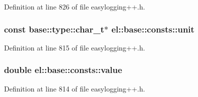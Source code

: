 Definition at line 826 of file easylogging++.\+h.

\hypertarget{namespaceel_1_1base_1_1consts_a0c99046e04195e209e09f90ea71dd5fd}{}
\subsubsection[{unit}]{\setlength{\rightskip}{0pt plus 5cm}const {\bf base\+::type\+::char\+\_\+t}$\ast$ el\+::base\+::consts\+::unit}\label{namespaceel_1_1base_1_1consts_a0c99046e04195e209e09f90ea71dd5fd}


Definition at line 815 of file easylogging++.\+h.

\hypertarget{namespaceel_1_1base_1_1consts_a7463944511904d9ca3dd4b6933a3e6f1}{}
\subsubsection[{value}]{\setlength{\rightskip}{0pt plus 5cm}double el\+::base\+::consts\+::value}\label{namespaceel_1_1base_1_1consts_a7463944511904d9ca3dd4b6933a3e6f1}


Definition at line 814 of file easylogging++.\+h.


